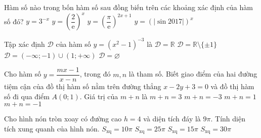 \begin{ex}%
	Hàm số nào trong bốn hàm số sau đồng biến trên các khoảng xác định của hàm số đó?
	\choice
	{$y=3^{-x}$}
	{$y=\left(\dfrac{2}{\mathrm{e}}\right)^x$}
	{\True $y=\left(\dfrac{\pi}{\mathrm{e}}\right)^{2x+1}$}
	{$y=\left(\left|\sin 2017\right|\right)^x$}
\end{ex}

\begin{ex}%
	Tập xác định $\mathscr{D}$ của hàm số $y=\left(x^2-1\right)^{-3}$ là
	\choice
	{$\mathscr{D}=\mathbb{R}$}
	{\True $\mathscr{D}=\mathbb{R}\setminus\{\pm 1\}$}
	{$\mathscr{D}=(-\infty;-1)\cup(1;+\infty)$}
	{$\mathscr{D}=\varnothing$}
\end{ex}

\begin{ex}%
	Cho hàm số $y=\dfrac{mx-1}{x-n}$, trong đó $m,n$ là tham số. Biết giao điểm của hai đường tiệm cận của đồ thị hàm số nằm trên đường thẳng $x-2y+3=0$ và đồ thị hàm số đi qua điểm $A(0;1)$. Giá trị của $m+n$ là
	\choice
	{\True $m+n=3$}
	{$m+n=-3$}
	{$m+n=1$}
	{$m+n=-1$}
\end{ex}

\begin{ex}%
	Cho hình nón tròn xoay có đường cao $h=4$ và diện tích đáy là $9\pi$. Tính diện tích xung quanh của hình nón.
	\choice
	{$S_{\mathrm{xq}}=10\pi$}
	{$S_{\mathrm{xq}}=25\pi$}
	{\True $S_{\mathrm{xq}}=15\pi$}
	{$S_{\mathrm{xq}}=30\pi$}
\end{ex}

